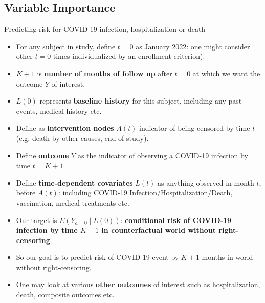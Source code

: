 \documentclass[t]{beamer}
\begin{document}
\subsection{Variable Importance}

\begin{frame}{Predicting risk for COVID-19 infection, hospitalization or death}

\begin{itemize}
\item For any subject in study, define $t=0$ as January 2022: one might consider other $t=0$ times individualized by an enrollment criterion).
\item $K+1$ is {\bf number of months of follow up} after $t=0$ at which we want the outcome $Y$  of interest.
\item $L(0)$ represents {\bf baseline history} for this subject, including any past events, medical history etc.
\item Define as {\bf intervention nodes} $A(t)$ indicator of being censored by time $t$ (e.g. death by other causes, end of study).
\item Define {\bf outcome} $Y$ as the indicator of observing a COVID-19 infection by time  $t=K+1$.
\item Define {\bf time-dependent covariates} $L(t)$ as anything observed in month $t$, before $A(t)$: including COVID-19 Infection/Hospitalization/Death, vaccination, medical treatments etc.
\end{itemize}
\end{frame}
\begin{frame}
\begin{itemize}
\item Our target is $E(Y_{\bar{a}=0}\mid L(0))$: {\bf conditional risk of COVID-19 infection by time $K+1$ in counterfactual world without right-censoring}.
\item So our goal is to predict risk of COVID-19 event by $K+1$-months in world without right-censoring.
\item One  may look at various {\bf other outcomes} of interest such as hospitalization, death, composite outcomes etc.
\end{itemize}
\end{frame}
\end{document}
